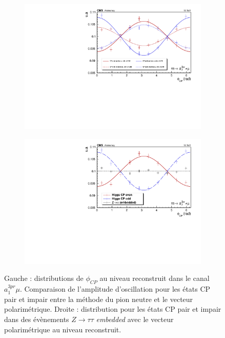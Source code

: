 \begin{figure}[]
  \begin{subfigure}[b]{0.5\linewidth}
    \centering
    \includegraphics[width=\linewidth]{Chapitre6/Images/A1MU/a1mu_pvdpreco.pdf} 
    \caption*{} 
    \vspace{0.5ex}
  \end{subfigure}%
  \begin{subfigure}[b]{0.5\linewidth}
    \centering
    \includegraphics[width=\linewidth]{Chapitre6/Images/A1MU/a1mu_pv.pdf} 
    \caption*{} 
    \vspace{0.5ex}
  \end{subfigure} 
\caption{Gauche : distributions de $\phi_{CP}$ au niveau reconstruit dans le canal $a_1^{3pr}\mu$. Comparaison de l'amplitude d'oscillation pour les états CP pair et impair entre la méthode du pion neutre et le vecteur polarimétrique. Droite : distribution pour les états CP pair et impair dans des évènements $Z\to\tau\tau$ \textit{embedded} avec le vecteur polarimétrique au niveau reconstruit.}
\label{a1mureco}
\end{figure}

